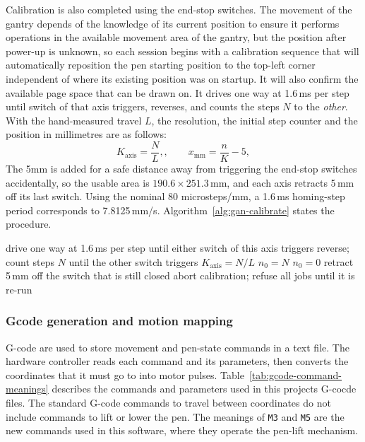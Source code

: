 \label{sec:gan-calib}
Calibration is also completed using the end-stop switches. The movement of the gantry depends of the knowledge of its current position to ensure it performs operations in the available movement area of the gantry, but the position after power-up is unknown, so each session begins with a calibration sequence that will automatically reposition the pen starting position to the top-left corner independent of where its existing position was on startup. It will also confirm the available page space that can be drawn on. It drives one way at 1.6\,ms per step until switch of that axis triggers, reverses, and counts the steps $N$ to the \emph{other}. With the hand-measured travel $L$, the resolution, the initial step counter and the position in millimetres are as follows:
\begin{equation}
K_{\mathrm{axis}}=\frac{N}{L},,\qquad x_{\mathrm{mm}}=\frac{n}{K}-5,
\label{eq:des-calibration}
\end{equation}
The 5mm is added for a safe distance away from triggering the end-stop switches accidentally, so the usable area is $190.6\times251.3$\,mm, and each axis retracts 5\,mm off its last switch. Using the nominal 80 microsteps/mm, a 1.6\,ms homing-step period corresponds to 7.8125\,mm/s. Algorithm~\ref{alg:gan-calibrate} states the procedure.

\begin{algorithm}[!htbp]
\caption{Dynamic calibration of one axis}
\label{alg:gan-calibrate}
\begin{algorithmic}[1]
\STATE drive one way at 1.6\,ms per step until either switch of this axis triggers
\STATE reverse; count steps $N$ until the other switch triggers
\STATE $K_{\mathrm{axis}}=N/L$ 
    \STATE $n_0= N$
\ELSE
    \STATE $n_0=0$
\ENDIF
\STATE retract 5\,mm off the switch that is still closed
    \STATE abort calibration; refuse all jobs until it is re-run
\ENDIF
\end{algorithmic}
\end{algorithm}

\subsubsection{Gcode generation and motion mapping}
\label{sec:des-drive}
G-code are used to store movement and pen-state commands in a text file. The hardware controller reads each command and its parameters, then converts the coordinates that it must go to into motor pulses. Table~\ref{tab:gcode-command-meanings} describes the commands and parameters used in this projects G-cocde files. The standard G-code commands to travel between coordinates do not include commands to lift or lower the pen. The meanings of \texttt{M3} and \texttt{M5} are the new commands used in this software, where they operate the pen-lift mechanism.

